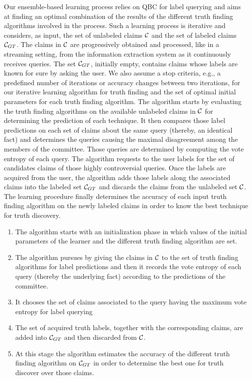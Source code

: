 Our ensemble-based learning process relies on QBC for label querying and aims at finding an optimal combination of the results
of the different truth finding algorithms involved in the process. Such a learning process is iterative and considers, as input,
the set of unlabeled claims $\mathcal{C}{}$ and the set of labeled claims $\mathcal{C}_{GT}$. The claims in $\mathcal{C}{}$ are progressively
obtained and processed, like in a streaming setting, from the information extraction system as it continuously receives queries.
The set $\mathcal{C}_{GT}$, initially empty, contains
claims whose labels are known for sure by asking the user. We also assume a stop criteria, e.g., a predefined number of iterations 
or accuracy changes between two iterations, for our iterative learning algorithm for truth finding and the set of optimal initial
parameters for each truth finding algorithm.
The algorithm starts by evaluating the truth finding algorithms on the available unlabeled claims in $\mathcal{C}{}$ for determining
the prediction of each technique. It then compares those label predictions on each set of claims about the same query (thereby, an identical fact)
and determines the queries causing the maximal disagreement among the members of the committee. Those queries are determined by computing 
the vote entropy of each query. The algorithm requests to the user labels for the set of candidates claims of those highly controversial queries.
Once the labels are acquired from the user, the algorithm adds those labels along the associated claims into the labeled set $\mathcal{C}_{GT}$ and 
discards the claims from the unlabeled set $\mathcal{C}{}$. The learning procedure finally determines the accuracy of each input truth finding algorithm
on the newly labeled claims in order to know the best technique for truth discovery. 

\begin{enumerate}
\item The algorithm starts with an initialization phase in which values of the initial parameters of the learner and the different truth 
finding algorithm are set.
 \item The algorithm pursues by giving the claims in $\mathcal{C}{}$ to the set of truth finding algorithms for label predictions and then 
 it records the vote entropy of each query (thereby the underlying fact) according to the predictions of the committee.
 \item It chooses the set of claims associated to the query having the maximum vote entropy for label querying
 \item The set of acquired truth labels, together with the corresponding claims, are added into  $\mathcal{C}_{GT}$ and then discarded from $\mathcal{C}{}$.
 \item At this stage the algorithm estimates the accuracy of the different truth finding algorithm on  $\mathcal{C}_{GT}$ in order to determine the best one
 for truth discover over those claims.
\end{enumerate}

